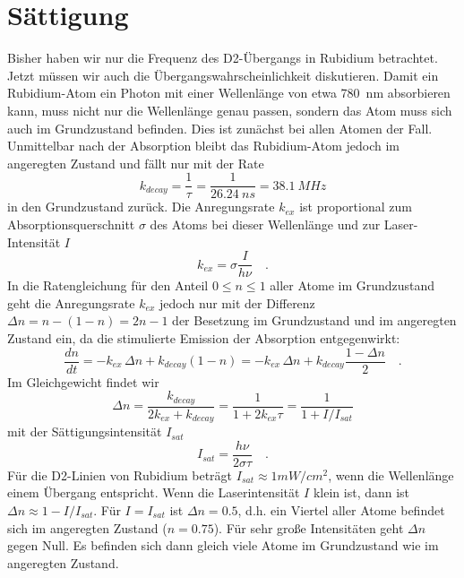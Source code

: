 \begin{questions}
\end{questions}


\section{Sättigung}

Bisher haben wir nur die Frequenz des D2-Übergangs in Rubidium betrachtet. Jetzt müssen wir auch die Übergangswahrscheinlichkeit diskutieren. Damit ein Rubidium-Atom ein Photon mit einer Wellenlänge von etwa 780~nm absorbieren kann, muss nicht nur die Wellenlänge genau passen, sondern das Atom muss sich auch im Grundzustand befinden. Dies ist zunächst bei allen Atomen der Fall. Unmittelbar nach der Absorption bleibt das Rubidium-Atom jedoch im angeregten Zustand und fällt nur mit der Rate 
\begin{equation}
	k_{decay} = \frac{1}{\tau} = \frac{1}{26.24~ns} = 38.1~MHz
\end{equation}
in den Grundzustand zurück. Die Anregungsrate $k_{ex}$ ist proportional zum Absorptionsquerschnitt $\sigma$ des Atoms bei dieser Wellenlänge und zur Laser-Intensität $I$
\begin{equation}
	k_{ex} = \sigma \frac{I}{h \nu} \quad .
\end{equation}
In die Ratengleichung für den Anteil $0 \le n \le 1$ aller Atome im Grundzustand geht die Anregungsrate $k_{ex}$ jedoch nur mit der Differenz $\Delta n = n - (1-n) = 2n -1$ der Besetzung im Grundzustand und im angeregten Zustand ein, da die stimulierte Emission der Absorption entgegenwirkt:
\begin{equation}
	\frac{d n}{dt} = - k_{ex} \, \Delta n + k_{decay} (1-n) = - k_{ex} \, \Delta n + k_{decay} \frac{1 - \Delta n}{2} \quad .
\end{equation}
 Im Gleichgewicht findet wir
\begin{equation}
	\Delta n = \frac{k_{decay}}{2 k_{ex}+ k_{decay}} = \frac{1}{1 + 2 k_{ex} \tau } = \frac{1}{1 + I / I_{sat}}
\end{equation}
mit der Sättigungsintensität $I_{sat}$
\begin{equation}
	I_{sat} = \frac{h \nu}{2 \sigma \tau } \quad .
\end{equation}
Für die D2-Linien von Rubidium beträgt $I_{sat} \approx 1 mW/cm^2$, wenn die Wellenlänge einem Übergang entspricht.
Wenn die Laserintensität $I$ klein ist, dann ist $\Delta n \approx 1 - I / I_{sat}$. Für $I = I_{sat}$ ist $\Delta n = 0.5$, d.h. ein Viertel aller Atome befindet sich im angeregten Zustand ($n=0.75$). Für sehr große Intensitäten geht $\Delta n$ gegen Null. Es befinden sich dann gleich viele Atome im Grundzustand wie im angeregten Zustand.


